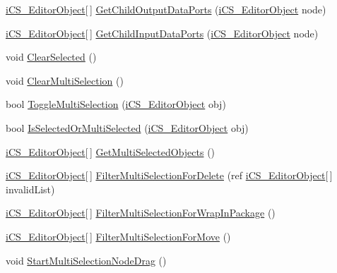 \begin{DoxyCompactItemize}
\item 
\hyperlink{classi_c_s___editor_object}{i\+C\+S\+\_\+\+Editor\+Object}\mbox{[}$\,$\mbox{]} \hyperlink{classi_c_s___i_storage_a6ad3deeac40f6f7329895a65acead2fd}{Get\+Child\+Output\+Data\+Ports} (\hyperlink{classi_c_s___editor_object}{i\+C\+S\+\_\+\+Editor\+Object} node)
\item 
\hyperlink{classi_c_s___editor_object}{i\+C\+S\+\_\+\+Editor\+Object}\mbox{[}$\,$\mbox{]} \hyperlink{classi_c_s___i_storage_a068e58e5e691375a2e73169b1246675a}{Get\+Child\+Input\+Data\+Ports} (\hyperlink{classi_c_s___editor_object}{i\+C\+S\+\_\+\+Editor\+Object} node)
\item 
void \hyperlink{classi_c_s___i_storage_a2f358b8e31af3d82d56064be7d2f0460}{Clear\+Selected} ()
\item 
void \hyperlink{classi_c_s___i_storage_a52fe029d8003994ca07f84f1e5507d8d}{Clear\+Multi\+Selection} ()
\item 
bool \hyperlink{classi_c_s___i_storage_ace33d8e4709c7404b28ee6a6e840d96a}{Toggle\+Multi\+Selection} (\hyperlink{classi_c_s___editor_object}{i\+C\+S\+\_\+\+Editor\+Object} obj)
\item 
bool \hyperlink{classi_c_s___i_storage_a4b6c857aa2bd203160cef81d0b59adfa}{Is\+Selected\+Or\+Multi\+Selected} (\hyperlink{classi_c_s___editor_object}{i\+C\+S\+\_\+\+Editor\+Object} obj)
\item 
\hyperlink{classi_c_s___editor_object}{i\+C\+S\+\_\+\+Editor\+Object}\mbox{[}$\,$\mbox{]} \hyperlink{classi_c_s___i_storage_a56fcbd37d0c486f02def46c80576749a}{Get\+Multi\+Selected\+Objects} ()
\item 
\hyperlink{classi_c_s___editor_object}{i\+C\+S\+\_\+\+Editor\+Object}\mbox{[}$\,$\mbox{]} \hyperlink{classi_c_s___i_storage_a2f19af264d5a09a33bd83d8d89be754f}{Filter\+Multi\+Selection\+For\+Delete} (ref \hyperlink{classi_c_s___editor_object}{i\+C\+S\+\_\+\+Editor\+Object}\mbox{[}$\,$\mbox{]} invalid\+List)
\item 
\hyperlink{classi_c_s___editor_object}{i\+C\+S\+\_\+\+Editor\+Object}\mbox{[}$\,$\mbox{]} \hyperlink{classi_c_s___i_storage_a84f1f53842311a2017f921a2a2c47db5}{Filter\+Multi\+Selection\+For\+Wrap\+In\+Package} ()
\item 
\hyperlink{classi_c_s___editor_object}{i\+C\+S\+\_\+\+Editor\+Object}\mbox{[}$\,$\mbox{]} \hyperlink{classi_c_s___i_storage_a0fb436150b97a6c5169adbf9974a5030}{Filter\+Multi\+Selection\+For\+Move} ()
\item 
void \hyperlink{classi_c_s___i_storage_ad5cdb7f48dc6014873b88f173bae1717}{Start\+Multi\+Selection\+Node\+Drag} ()

\end{DoxyCompactItemize}
